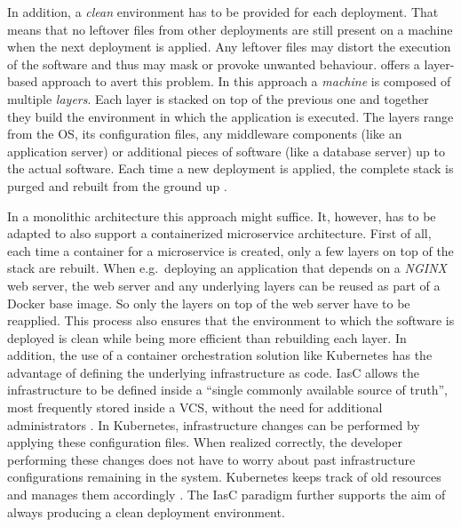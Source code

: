 In addition, a \textit{clean} environment has to be provided for each
deployment. That means that no leftover files from other deployments are still
present on a machine when the next deployment is applied. Any leftover files
may distort the execution of the software and thus may mask or provoke unwanted
behaviour. \autocite{ArtacDevOpsIntroducingInfrastructure2017} offers a
layer-based approach to avert this problem. In this approach a \textit{machine}
is composed of multiple \textit{layers}. Each layer is stacked on top of the
previous one and together they build the environment in which the application
is executed. The layers range from the \ac{OS}, its configuration files, any
middleware components (like an application server) or additional pieces of
software (like a database server) up to the actual software. Each time a new
deployment is applied, the complete stack is purged and rebuilt from the ground
up \autocite[p. 194]{MatyasContinuousIntegration2007}.

In a monolithic architecture this approach might suffice. It, however, has to
be adapted to also support a containerized microservice architecture. First of
all, each time a container for a microservice is created, only a few layers on
top of the stack are rebuilt. When e.g.\ deploying an application that depends
on a \textit{NGINX} web server, the web server and any underlying layers can
be reused as part of a Docker base image. So only the layers on top of the web
server have to be reapplied. This process also ensures that the environment to
which the software is deployed is clean while being more efficient
than rebuilding each layer. In addition, the use of a container orchestration
solution like Kubernetes has the advantage of defining the underlying
infrastructure as code. \ac{IasC} allows the infrastructure to be defined
inside a \enquote{single commonly available source of truth}, most frequently
stored inside a \ac{VCS}, without the need for additional administrators
\autocite{ArtacDevOpsIntroducingInfrastructure2017}. In Kubernetes,
infrastructure changes can be performed by applying these configuration files.
When realized correctly, the developer performing these changes does not have
to worry about past infrastructure configurations remaining in the system.
Kubernetes keeps track of old resources and manages them accordingly
\autocite{AuthorsDeployments2019}. The \ac{IasC} paradigm further supports the
aim of always producing a clean deployment environment.


